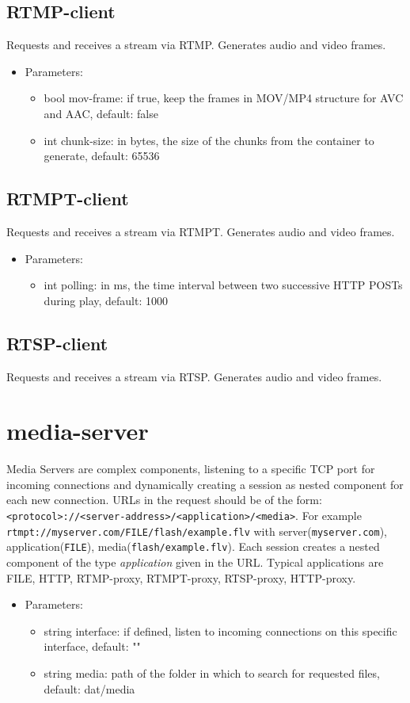 \subsection{RTMP-client}
Requests and receives a stream via RTMP. Generates audio and video frames.
\begin{itemize}
\item Parameters:
\begin{itemize}
\item bool mov-frame: if true, keep the frames in MOV/MP4 structure for AVC and AAC, default: false
\item int chunk-size: in bytes, the size of the chunks from the container to generate, default: 65536
\end{itemize}
\end{itemize}
\subsection{RTMPT-client}
Requests and receives a stream via RTMPT. Generates audio and video frames.
\begin{itemize}
\item Parameters:
\begin{itemize}
\item int polling: in ms, the time interval between two successive HTTP POSTs during play, default: 1000
\end{itemize}
\end{itemize}
\subsection{RTSP-client}
Requests and receives a stream via RTSP. Generates audio and video frames.
\newpage
\section{media-server}
Media Servers are complex components, listening to a specific TCP port for incoming connections and dynamically creating a session as nested component for each new connection. URLs in the request should be of the form: \texttt{<protocol>://<server-address>/<application>/<media>}. For example \texttt{rtmpt://myserver.com/FILE/flash/example.flv} with server(\texttt{myserver.com}), application(\texttt{FILE}), media(\texttt{flash/example.flv}). Each session creates a nested component of the type \textit{application} given in the URL. Typical applications are FILE, HTTP, RTMP-proxy, RTMPT-proxy, RTSP-proxy, HTTP-proxy.
\begin{itemize}
\item Parameters:
\begin{itemize}
\item string interface: if defined, listen to incoming connections on this specific interface, default: ""
\item string media: path of the folder in which to search for requested files, default: dat/media
\end{itemize}
\end{itemize}
